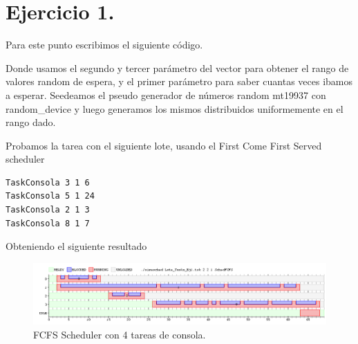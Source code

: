 \section*{Ejercicio 1.}

Para este punto escribimos el siguiente código.



Donde usamos el segundo y tercer parámetro del vector para obtener el rango de valores random de espera, y el primer parámetro para saber cuantas veces ibamos a esperar. Seedeamos el pseudo generador de números random mt19937 con random\_device y luego generamos los mismos distribuidos uniformemente en el rango dado. \newline

Probamos la tarea con el siguiente lote, usando el First Come First Served scheduler

\begin{Verbatim}
TaskConsola 3 1 6
TaskConsola 5 1 24
TaskConsola 2 1 3
TaskConsola 8 1 7
\end{Verbatim}

Obteniendo el siguiente resultado

\begin{figure}[h]
    \centerline{\includegraphics[scale=0.55]{images/Ej1}}
    \caption{FCFS Scheduler con 4 tareas de consola.}
\end{figure}


